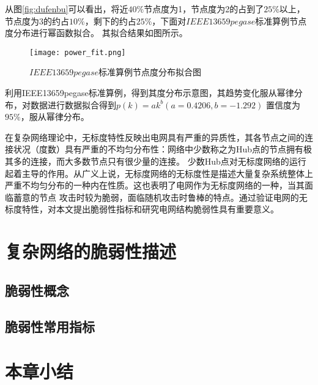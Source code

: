 从图\ref{fig:dufenbu}可以看出，将近$40\%$节点度为1，节点度为2的占到了$25\%$以上，节点度为3的约占$10\%$，剩下的约占$25\%$，下面对$IEEE13659pegase$标准算例节点度分布进行幂函数拟合。
其拟合结果如图所示。
\begin{figure}[H] %
  \centering
  \texttt{[image: power\_fit.png]}
  \caption{$IEEE13659pegase$标准算例节点度分布拟合图}
  \label{fig:fower_fit}
\end{figure}

利用IEEE13659pegase标准算例，得到其度分布示意图，其趋势变化服从幂律分布，对数据进行数据拟合得到$p(k)=a k^{b}(a=0.4206, b=-1.292)$ 置信度为$95\%$，服从幂律分布。

在复杂网络理论中，无标度特性反映出电网具有严重的异质性，其各节点之间的连接状况（度数）具有严重的不均匀分布性：网络中少数称之为Hub点的节点拥有极其多的连接，而大多数节点只有很少量的连接。
少数Hub点对无标度网络的运行起着主导的作用。从广义上说，无标度网络的无标度性是描述大量复杂系统整体上严重不均匀分布的一种内在性质。这也表明了电网作为无标度网络的一种，当其面临蓄意的节点
攻击时较为脆弱，面临随机攻击时鲁棒的特点。通过验证电网的无标度特性，对本文提出脆弱性指标和研究电网结构脆弱性具有重要意义。

\section{复杂网络的脆弱性描述}
\label{sec:load}



\subsection{脆弱性概念}
\label{sec:loadEffect}




\subsection{脆弱性常用指标}
\label{sec:loadModel}




\section{本章小结}
\label{sec:sum2}





